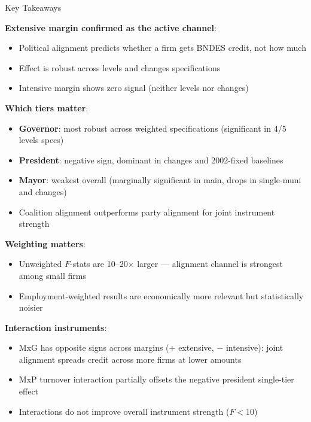 \documentclass[aspectratio=169,11pt]{beamer}
\begin{document}
\begin{frame}[allowframebreaks]{Key Takeaways}

\textbf{Extensive margin confirmed as the active channel}:
\begin{itemize}
    \item Political alignment predicts whether a firm gets BNDES credit, not how much
    \item Effect is robust across levels and changes specifications
    \item Intensive margin shows zero signal (neither levels nor changes)
\end{itemize}

\medskip

\textbf{Which tiers matter}:
\begin{itemize}
    \item \textbf{Governor}: most robust across weighted specifications (significant in 4/5 levels specs)
    \item \textbf{President}: negative sign, dominant in changes and 2002-fixed baselines
    \item \textbf{Mayor}: weakest overall (marginally significant in main, drops in single-muni and changes)
    \item Coalition alignment outperforms party alignment for joint instrument strength
\end{itemize}

\framebreak

\textbf{Weighting matters}:
\begin{itemize}
    \item Unweighted $F$-stats are 10--20$\times$ larger --- alignment channel is strongest among small firms
    \item Employment-weighted results are economically more relevant but statistically noisier
\end{itemize}

\medskip

\textbf{Interaction instruments}:
\begin{itemize}
    \item MxG has opposite signs across margins ($+$ extensive, $-$ intensive): joint alignment spreads credit across more firms at lower amounts
    \item MxP turnover interaction partially offsets the negative president single-tier effect
    \item Interactions do not improve overall instrument strength ($F < 10$)
\end{itemize}

\end{frame}
\end{document}
